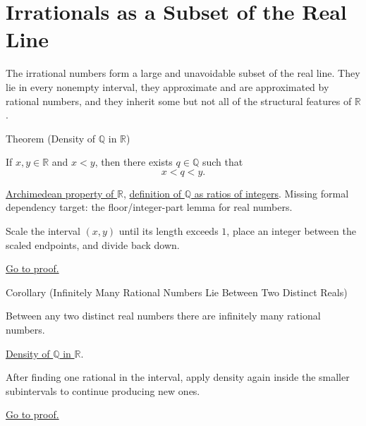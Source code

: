 
\section{Irrationals as a Subset of the Real Line}
\label{sec:irrationals-as-a-subset}

\begin{exposition}
The irrational numbers form a large and unavoidable subset of the real line.
They lie in every nonempty interval, they approximate and are approximated by
rational numbers, and they inherit some but not all of the structural features
of $\mathbb{R}$.
\end{exposition}

\begin{theorembox}{Theorem (Density of $\mathbb{Q}$ in $\mathbb{R}$)}
\begin{theorem}
\label{thm:q-dense-in-r}
If $x,y\in\mathbb{R}$ and $x<y$, then there exists $q\in\mathbb{Q}$ such that
\[
x<q<y.
\]
\end{theorem}
\end{theorembox}
\begin{dependencies}
\hyperref[thm:archimedean-property]{Archimedean property of $\mathbb{R}$},
\hyperref[def:rationals]{definition of $\mathbb{Q}$ as ratios of integers}.
Missing formal dependency target: the floor/integer-part lemma for real numbers.
\end{dependencies}
\begin{remark*}
Scale the interval $(x,y)$ until its length exceeds $1$, place an integer
between the scaled endpoints, and divide back down.
\end{remark*}
\begin{remark*}[Proof]
\hyperref[prf:q-dense-in-r]{Go to proof.}
\end{remark*}

\begin{corollarybox}{Corollary (Infinitely Many Rational Numbers Lie Between Two Distinct Reals)}
\begin{corollary}
\label{cor:infinitely-many-rationals-between}
Between any two distinct real numbers there are infinitely many rational numbers.
\end{corollary}
\end{corollarybox}
\begin{dependencies}
\hyperref[thm:q-dense-in-r]{Density of $\mathbb{Q}$ in $\mathbb{R}$}.
\end{dependencies}
\begin{remark*}
After finding one rational in the interval, apply density again inside the
smaller subintervals to continue producing new ones.
\end{remark*}
\begin{remark*}[Proof]
\hyperref[prf:infinitely-many-rationals-between]{Go to proof.}
\end{remark*}

